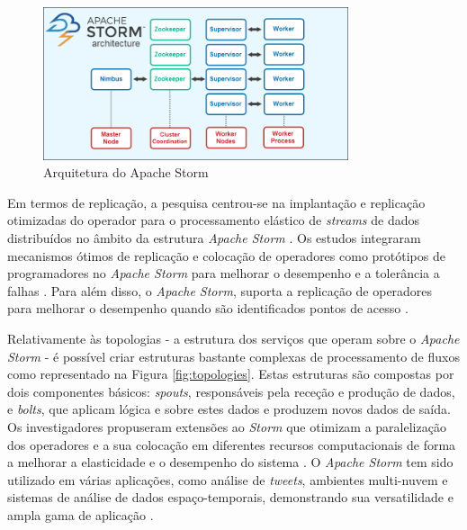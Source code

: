 \begin{figure}[H]
    \centering
    \includegraphics[width=0.8\textwidth]{media/content/estado-arte/apache-storm-architecture.png}
    \caption{Arquitetura do Apache Storm}
    \label{fig:storm-architecture}
\end{figure}

Em termos de replicação, a pesquisa centrou-se na implantação e replicação otimizadas do 
operador para o processamento elástico de \textit{streams} de dados distribuídos no âmbito 
da estrutura \textit{Apache Storm} \cite{storm2017b}. Os estudos integraram mecanismos ótimos de
replicação e colocação de operadores como protótipos de programadores no \textit{Apache Storm} para
melhorar o desempenho e a tolerância a falhas \cite{storm2017c}. Para além disso, o 
\textit{Apache Storm}, suporta a replicação de operadores para melhorar o desempenho quando são 
identificados pontos de acesso \cite{storm2018c}.

Relativamente às topologias - a estrutura dos serviços que operam sobre o \textit{Apache Storm} - 
é possível criar estruturas bastante complexas de processamento de fluxos como representado na
Figura \ref{fig:topologies}. Estas estruturas são compostas por dois componentes básicos: 
\textit{spouts}, responsáveis pela receção e produção de dados, e \textit{bolts}, que aplicam 
lógica e sobre estes dados e produzem novos dados de saída. Os investigadores propuseram extensões 
ao \textit{Storm} que otimizam a paralelização dos operadores e a sua colocação em diferentes 
recursos computacionais de forma a melhorar a elasticidade e o desempenho do sistema 
\cite{storm2017d} . O \textit{Apache Storm} tem sido utilizado em várias aplicações, como análise 
de \textit{tweets}, ambientes multi-nuvem e sistemas de análise de dados espaço-temporais, 
demonstrando sua versatilidade e ampla gama de aplicação \cite{storm2018d} \cite{storm2020} 
\cite{storm2021}.

